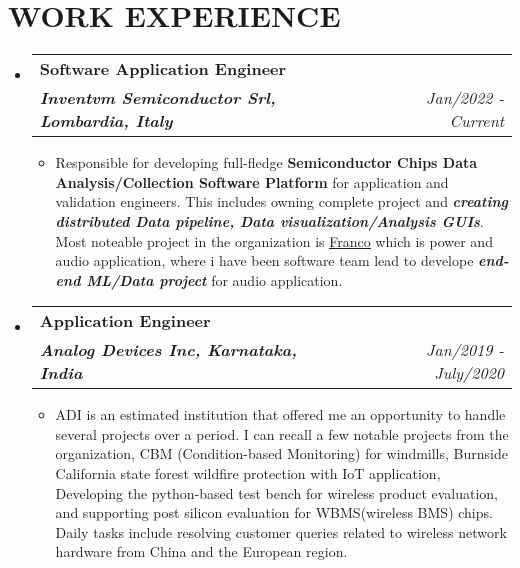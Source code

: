 \documentclass[letterpaper,11pt]{article}
\makeatletter
\newcommand{\resumeItem}[1]{
  \item\small{
    {#1 \vspace{-1pt}}
  }
}
\newcommand{\resumeSubheading}[4]{
  \vspace{-2pt}\item
    \begin{tabular*}{1.0\textwidth}[t]{l@{\extracolsep{\fill}}r}
      \textbf{\large#1} & \textbf{\small #2} \\
      \textit{\large#3} & \textit{\small #4} \\
      
    \end{tabular*}\vspace{-7pt}
}
\newcommand{\resumeSubHeadingListStart}{\begin{itemize}[leftmargin=0.0in, label={}]}
\newcommand{\resumeSubHeadingListEnd}{\end{itemize}}
\newcommand{\resumeItemListStart}{\begin{itemize}[leftmargin=0.1in]}
\newcommand{\resumeItemListEnd}{\end{itemize}\vspace{-5pt}}
\makeatother
\begin{document}
\section{\color{airforceblue}WORK EXPERIENCE}
  \resumeSubHeadingListStart

    \resumeSubheading
      {Software Application Engineer}{} 
      {\textbf{\textit{Inventvm Semiconductor Srl, Lombardia, Italy}}}{Jan/2022 - Current}
      \resumeItemListStart
            \resumeItem{
              \normalsize{Responsible for developing full-fledge \textbf{Semiconductor Chips Data Analysis/Collection Software Platform} for application and validation engineers.
               This includes owning complete project and \textbf{\textit{creating distributed Data pipeline, Data visualization/Analysis GUIs}}. 
               Most noteable project in the organization is \href{[https://github.com/HarishKumarSedu/Franco_FrameWork]}{\color{blue}\underline{Franco}} which is power and audio application, where i have been  software team lead to develope \textbf{\textit{end-end ML/Data project}} for audio application.  
                }
              }
      \resumeItemListEnd  

    \resumeSubheading
      {Application Engineer}{} 
      {\textbf{\textit{Analog Devices Inc, Karnataka, India}}}{Jan/2019 - July/2020}
      \resumeItemListStart
            \resumeItem{
              \normalsize{ADI is an
              estimated institution that offered me an opportunity to handle several projects over a period. I can recall a few notable
              projects from the organization, CBM (Condition-based Monitoring) for windmills, Burnside California state forest wildfire
              protection with IoT application, Developing the python-based
              test bench for wireless product evaluation, and supporting post
              silicon evaluation for WBMS(wireless BMS) chips. Daily tasks
              include resolving customer queries related to wireless network
              hardware from China and the European region.}}  
      \resumeItemListEnd  

  \resumeSubHeadingListEnd
\vspace{-12pt}


\end{document}
